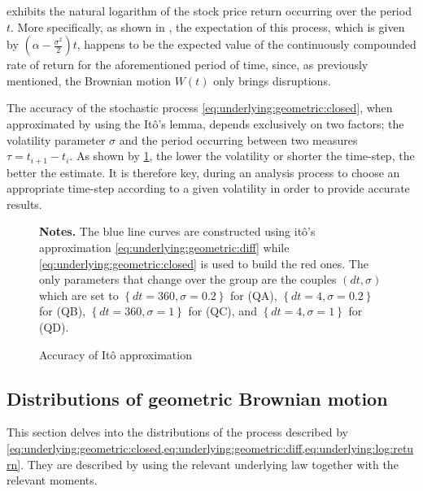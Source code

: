 \documentclass[12pt,a4paper]{report}
\newcommand{\Bm}{W\left(t\right)}
\begin{document}
 exhibits the natural logarithm of the stock price return occurring over the period $t$. 
More specifically,  as shown in \citet{hull}, the expectation of this process, which is given by $(\alpha - \frac{\sigma ^2}{2})  t$, happens to be the expected value of the continuously compounded rate of return for the aforementioned period of time, since, as previously mentioned, the Brownian motion $\Bm$ only brings disruptions.


The accuracy of the stochastic process \ref{eq:underlying:geometric:closed}, when approximated by using the Itô's lemma, depends exclusively on two factors; the volatility parameter $\sigma$ and the period occurring between two measures $\tau = t_{i+1} - t_i$. 
As shown by \cref{p:itoaccuracy}, the lower the volatility or shorter the time-step, the better the estimate.
It is therefore key, during an analysis process to choose an appropriate time-step according to a given volatility in order to provide accurate results.


\begin{figure}[h]
\centering

\caption{Accuracy of Itô approximation}
  \begin{changemargin}{0.5cm}{0.5cm}
  \medskip
\footnotesize
{}\textbf{Notes.} The blue line curves are constructed using itô's approximation \ref{eq:underlying:geometric:diff} while  \cref{eq:underlying:geometric:closed} is used to build the red ones. 
The only parameters that change over the group are the couples $(dt, \sigma)$ which are set to $\left \{dt = 360, \sigma = 0.2 \right \}$ for (QA), $\left \{dt = 4, \sigma = 0.2\right \}$ for (QB), $\left \{dt = 360, \sigma = 1\right \}$ for (QC), and $\left \{dt = 4, \sigma = 1\right \}$ for (QD).  
\end{changemargin}
\label{p:itoaccuracy}
\end{figure}




\subsection{Distributions of geometric Brownian motion}
\label{sub:Distribution of the stock price process}

This section delves into the distributions of the process described by \cref{eq:underlying:geometric:closed,eq:underlying:geometric:diff,eq:underlying:log:return}. 
They are described by using the relevant underlying law together with the relevant moments.
\end{document}
